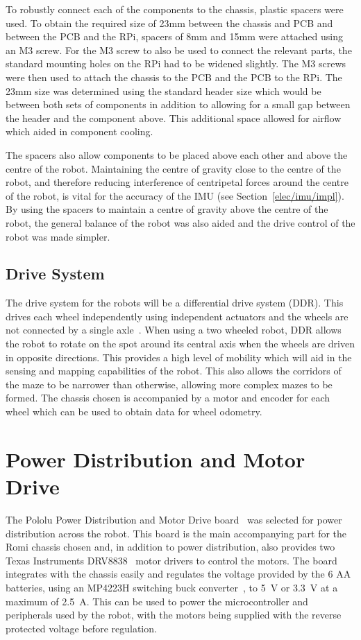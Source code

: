 To robustly connect each of the components to the 
chassis, plastic spacers were used. To obtain the required size 
of 23mm between the chassis and PCB 
and between the PCB and the RPi, spacers of 8mm and 15mm 
were attached using an M3 screw. For the M3 screw to also 
be used to connect the relevant parts, the standard mounting holes 
on the RPi had to be widened slightly. The M3 screws were 
then used to attach the chassis to the PCB and the PCB to the 
RPi. The 23mm size was determined using the standard 
header size which would be between both sets of components in 
addition to allowing for a small gap between the header and the 
component above. This additional space allowed for airflow which 
aided in component cooling. 

The spacers also allow components to be placed above each other 
and above the centre of the robot. Maintaining the centre of 
gravity close to the centre of the robot, and therefore reducing 
interference of centripetal forces around the centre of the robot, 
is vital for the accuracy of the IMU (see Section~\ref{elec/imu/impl}). By using 
the spacers to maintain a centre of gravity above the centre of the 
robot, the general balance of the robot was also aided and the drive 
control of the robot was made simpler.  

\subsection{Drive System}\label{mech/chassis/drive}

The drive system for the robots will be a differential drive system (DDR).
This drives each wheel independently using independent actuators and the
wheels are not connected by a single axle~\cite[p.~146]{braunl_embedded_2013}.
When using a two wheeled robot, DDR allows the
robot to rotate on the spot around its central axis when the wheels 
are driven in opposite directions. This provides a high level of 
mobility which will aid in the sensing and mapping capabilities of 
the robot. This also allows the corridors of the maze to be narrower 
than otherwise, allowing more complex mazes to be formed. The 
chassis chosen is accompanied by a motor and encoder for each wheel 
which can be used to obtain data for wheel odometry. 
  

\section{Power Distribution and Motor Drive}\label{elec/poweranddrive}
The Pololu Power Distribution and Motor Drive board~\cite{pololupower}
was selected for power distribution across
the robot. This board is the main accompanying part for the Romi
chassis chosen and, in addition to power distribution, also provides
two Texas Instruments DRV8838~\cite{texasdrivers} motor drivers to control
the motors. The board integrates with the chassis easily
and regulates the voltage provided by the 6 AA batteries, using an
MP4223H switching buck converter~\cite{mpbuck}, to \SI{5}{\volt} or
\SI{3.3}{\volt} at a maximum of \SI{2.5}{\ampere}. This can be used
to power the microcontroller and peripherals used by the robot, with the
motors being supplied with the reverse protected voltage before regulation.

